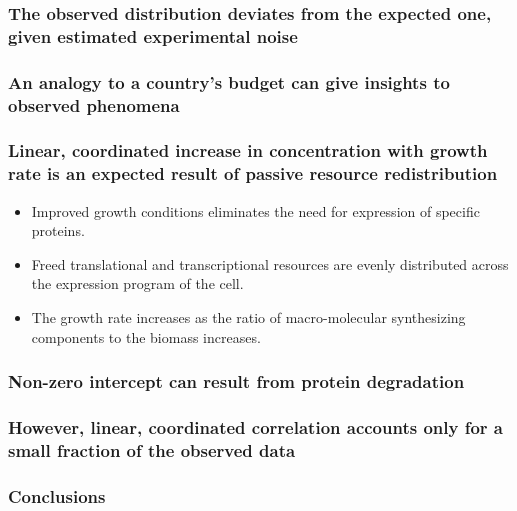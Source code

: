 \documentclass{beamer}
\begin{document}
\begin{frame}
\frametitle{The observed distribution deviates from the expected one, given estimated experimental noise}
\end{frame}

\begin{frame}
\frametitle{An analogy to a country's budget can give insights to observed phenomena}
\end{frame}

\begin{frame}
\frametitle{Linear, coordinated increase in concentration with growth rate is an expected result of passive resource redistribution}
\begin{itemize}
\item Improved growth conditions eliminates the need for expression of specific proteins.
\item Freed translational and transcriptional resources are evenly distributed across the expression program of the cell.
\item The growth rate increases as the ratio of macro-molecular synthesizing components to the biomass increases.
\end{itemize}
\end{frame}

\begin{frame}
\frametitle{Non-zero intercept can result from protein degradation}
\end{frame}

\begin{frame}
\frametitle{However, linear, coordinated correlation accounts only for a small fraction of the observed data}
\end{frame}
\begin{frame}
\frametitle{Conclusions}
\end{frame}
\end{document}
